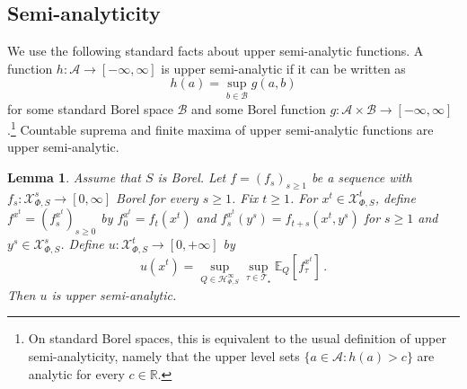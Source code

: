\documentclass[10pt, a4paper]{article}
\newcommand{\comm}[1]{\textcolor{orange}{#1}}
\newcommand{\A}{\mathcal A}
\newcommand{\B}{\mathcal B}
\newcommand{\E}{\mathbb E}
\newcommand{\Hh}{\mathcal H}
\newcommand{\HhP}{\Hh_{\Phi,S}}
\newcommand{\R}{\mathbb R}
\newcommand{\T}{\mathcal T}
\newcommand{\X}{\mathcal X}
\newcommand{\XP}{\X_{\Phi,S}}
\newtheorem{lemma}{Lemma}
\begin{document}

\subsection{Semi-analyticity}\label{app:coarse-semian}
We use the following standard facts about upper semi-analytic functions. A function $h:\A\to[-\infty,\infty]$ is upper semi-analytic if it can be written as
$$h(a)=\sup_{b\in\B}g(a,b)$$
for some standard Borel space $\B$ and some Borel function $g:\A\times\B\to[-\infty,\infty]$.\footnote{On standard Borel spaces, this is equivalent to the usual definition of upper semi-analyticity, namely that the upper level sets $\{a\in\A:h(a)>c\}$ are analytic for every $c\in\R$.} Countable suprema and finite maxima of upper semi-analytic functions are upper semi-analytic.

\begin{lemma}\label{lemma:continuation-envelope-usa}
Assume that $S$ is Borel. Let $f=(f_s)_{s\geq 1}$ be a sequence with $f_s:\XP^s\to[0,\infty]$ Borel for every $s\geq 1$. Fix $t\geq 1$. For $x^t\in\XP^t$, define $f^{x^t}=(f^{x^t}_s)_{s\geq 0}$ by $f^{x^t}_0=f_t(x^t)$ and $f^{x^t}_s(y^s)=f_{t+s}(x^t,y^s)$ for $s\geq 1$ and $y^s\in\XP^s$. Define $u:\XP^t\to[0,+\infty]$ by
$$u(x^t)=\sup_{Q\in\HhP^\infty}\sup_{\tau\in\T_\star}\E_Q[f^{x^t}_\tau]\,.$$
Then $u$ is upper semi-analytic.
\end{lemma}
\end{document}
